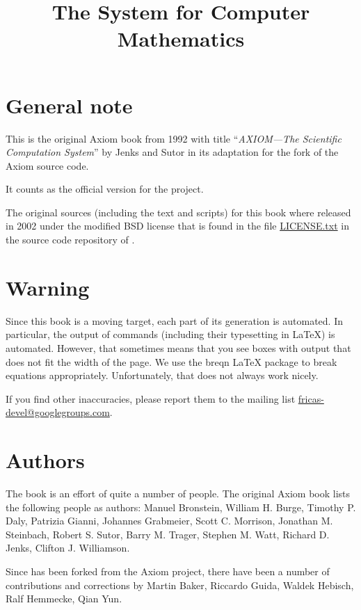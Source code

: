 \documentclass[twoside,a4paper]{book}
\title{The \Language{} System for Computer Mathematics}
\begin{document}
\maketitle
{}%
\setcounter{page}{0}


\section*{General note}
This is the original Axiom book from 1992 with title %
``\emph{AXIOM---The Scientific Computation System}'' by Jenks and
Sutor in its adaptation for the \Language{} fork of the Axiom source
code.

It counts as the official version for the \Language{} project.

The original sources (including the text and scripts) for this book
where released in 2002 under the modified BSD license that is found in
the file
\href{https://github.com/fricas/fricas/blob/master/LICENSE.txt}{LICENSE.txt}
in the source code repository of \Language{}.


\section*{Warning}
Since this book is a moving target, each part of its generation is
automated. In particular, the output of \Language{} commands
(including their typesetting in \LaTeX{}) is automated. However, that
sometimes means that you see boxes with output that does not fit the
width of the page. We use the breqn \LaTeX{} package to break
equations appropriately. Unfortunately, that does not always work
nicely.

If you find other inaccuracies, please report them to the mailing list
\href{mailto:fricas-devel@googlegroups.com}{fricas-devel@googlegroups.com}.

\section*{Authors}

The book is an effort of quite a number of people.
%
The original Axiom book lists the following people as authors:
Manuel Bronstein,
William H. Burge,
Timothy P. Daly,
Patrizia Gianni,
Johannes Grabmeier,
Scott C. Morrison,
Jonathan M. Steinbach,
Robert S. Sutor,
Barry M. Trager,
Stephen M. Watt,
Richard D. Jenks,
Clifton J. Williamson.

Since \Language{} has been forked from the Axiom project, there have
been a number of contributions and corrections by Martin Baker,
Riccardo Guida, Waldek Hebisch, Ralf Hemmecke, Qian Yun.
\end{document}
